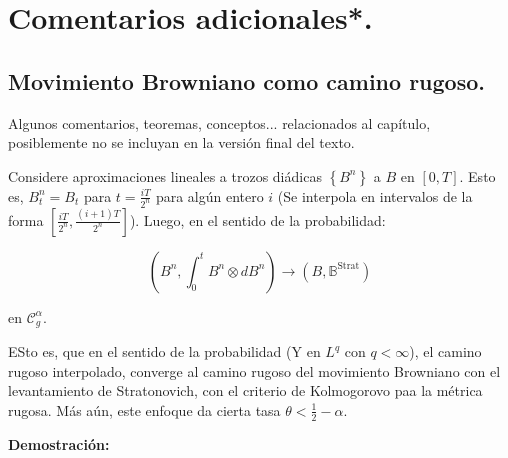



\section{Comentarios adicionales*.}

\subsection{Movimiento Browniano como camino rugoso.}

Algunos comentarios, teoremas, conceptos... relacionados al capítulo, posiblemente no se incluyan en la versión final del texto.

\begin{prop}
	Considere aproximaciones lineales a trozos diádicas $\left\{ B^{n} \right\}$ a $B$ en $[0,T]$. Esto es, $B_t^n = B_t$ para $t = \frac{iT}{2^n}$ para algún entero $i$ (Se interpola en intervalos de la forma $\left[ \frac{iT}{2^n}, \frac{(i+1)T}{2^n} \right]$). Luego, en el sentido de la probabilidad:

	\[
		\left( B^n, \int_0^t B^n \otimes dB^n \right) \rightarrow (B, \mathbb{B}^{\text{Strat}})
	\]

	en $\mathcal{C}^{\alpha}_g$.

\end{prop}

ESto es, que en el sentido de la probabilidad (Y en $L^q$ con $q < \infty$), el camino rugoso interpolado, converge al camino rugoso del movimiento Browniano con el levantamiento de Stratonovich, con el criterio de Kolmogorovo paa la métrica rugosa. Más aún, este enfoque da cierta tasa $\theta < \frac{1}{2} - \alpha$. 
 

\textbf{Demostración:}